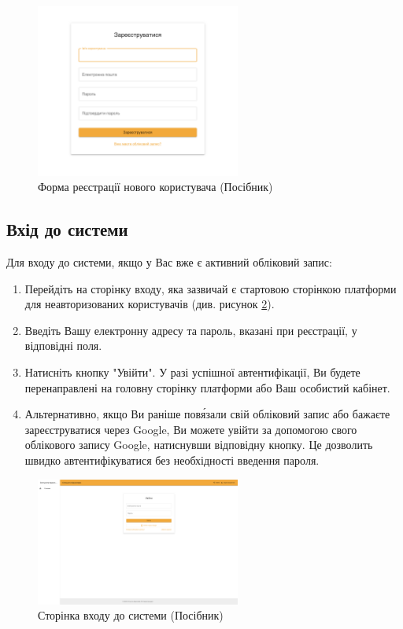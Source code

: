 \begin{figure}[htbp]
    \centering
    \includegraphics[width=0.6\textwidth]{practice_report/images/registration_form.png}
    \caption{Форма реєстрації нового користувача (Посібник)}
    \label{fig:manual_registration_form}
\end{figure}


\subsection{Вхід до системи}
\label{subsec:manual_login}
Для входу до системи, якщо у Вас вже є активний обліковий запис:
\begin{enumerate}
    \item Перейдіть на сторінку входу, яка зазвичай є стартовою сторінкою платформи для неавторизованих користувачів (див. рисунок \ref{fig:manual_login_page}).
    \item Введіть Вашу електронну адресу та пароль, вказані при реєстрації, у відповідні поля.
    \item Натисніть кнопку "Увійти". У разі успішної автентифікації, Ви будете перенаправлені на головну сторінку платформи або Ваш особистий кабінет.
    \item Альтернативно, якщо Ви раніше пов\'язали свій обліковий запис або бажаєте зареєструватися через Google, Ви можете увійти за допомогою свого облікового запису Google, натиснувши відповідну кнопку. Це дозволить швидко автентифікуватися без необхідності введення пароля.
\end{enumerate}

\begin{figure}[htbp]
    \centering
    \includegraphics[width=0.6\textwidth]{practice_report/images/login_page.png}
    \caption{Сторінка входу до системи (Посібник)}
    \label{fig:manual_login_page}
\end{figure}

